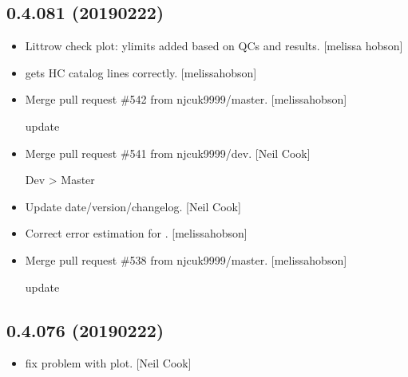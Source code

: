 \documentclass[a4paper,10pt,english]{report}
\begin{document}
\subsection{0.4.081 (2019\sphinxhyphen{}02\sphinxhyphen{}22)}
\label{\detokenize{misc/changelog:id197}}\begin{itemize}
\item {} 
Littrow check plot: ylimits added based on QCs and results. {[}melissa\sphinxhyphen{}
hobson{]}

\item {} 
 gets HC catalog lines correctly. {[}melissa\sphinxhyphen{}hobson{]}

\item {} 
Merge pull request \#542 from njcuk9999/master. {[}melissa\sphinxhyphen{}hobson{]}

update

\item {} 
Merge pull request \#541 from njcuk9999/dev. {[}Neil Cook{]}

Dev \textendash{}\textgreater{} Master

\item {} 
Update date/version/changelog. {[}Neil Cook{]}

\item {} 
Correct error estimation for . {[}melissa\sphinxhyphen{}hobson{]}

\item {} 
Merge pull request \#538 from njcuk9999/master. {[}melissa\sphinxhyphen{}hobson{]}

update

\end{itemize}


\subsection{0.4.076 (2019\sphinxhyphen{}02\sphinxhyphen{}22)}
\label{\detokenize{misc/changelog:id198}}\begin{itemize}
\item {} 
 \sphinxhyphen{} fix problem with  plot. {[}Neil
Cook{]}

\end{itemize}
\end{document}
